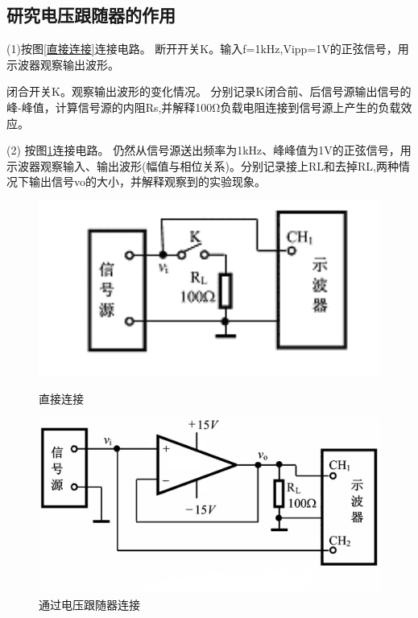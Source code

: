\documentclass[a4paper]{article}
\theoremstyle{definition}
\theoremstyle{plain}
\theoremstyle{remark}
\begin{document}
\subsection{研究电压跟随器的作用}

(1)按图\ref{直接连接}连接电路。
断开开关K。输入f=1kHz,Vipp=1V的正弦信号，用示波器观察输出波形。

闭合开关K。观察输出波形的变化情况。
分别记录K闭合前、后信号源输出信号的峰-峰值，计算信号源的内阻Rs,并解释100Ω负载电阻连接到信号源上产生的负载效应。


(2) 按图\ref{通过电压跟随器连接}连接电路。
仍然从信号源送出频率为1kHz、峰峰值为1V的正弦信号，用示波器观察输入、输出波形(幅值与相位关系)。分别记录接上RL和去掉RL,两种情况下输出信号vo的大小，并解释观察到的实验现象。


\begin{figure}[H]
	\begin{minipage}[t]{0.5\linewidth}
		\centering
		\includegraphics[width=1\textwidth]{直接连接}
		\caption{直接连接}
		\label{直接连接}
	\end{minipage}%
	\begin{minipage}[t]{0.5\linewidth}
		\centering
		\includegraphics[width=1\textwidth]{通过电压跟随器连接}
		\caption{通过电压跟随器连接}
		\label{通过电压跟随器连接}
	\end{minipage}
\end{figure}
\end{document}
